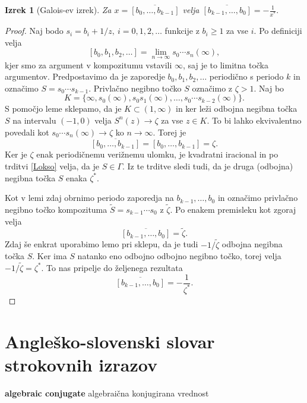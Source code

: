 \documentclass[a4paper,12pt]{article}
\newcommand{\geslo}[2]{\noindent\textbf{#1} \quad \hangindent=1cm #2\\[-1pc]}
\newtheorem*{izrek}{Izrek}
\newenvironment{dokaz}[1][Dokaz]{\begin{proof}}{\end{proof}}
\begin{document}
\begin{izrek}[Galois-ev izrek]
	Za $x = \overline{[b_0, \ldots, b_{k-1}]}$ velja $\overline{[b_{k-1}, \ldots, b_0]} = - \frac{1}{x^*}.$
\end{izrek}


\begin{dokaz}
    Naj bodo $s_i = b_i + 1/z,\ i = 0, 1, 2, \ldots$ funkcije z $b_i \geq 1$ za vse $i$. Po definiciji velja
    \[
        [b_0, b_1, b_2, \ldots] = \lim_{n \to \infty} s_0\cdots s_n (\infty),   
    \]
    kjer smo za argument v kompozitumu vstavili $\infty$, saj je to limitna točka argumentov. Predpostavimo da je zaporedje $b_0, b_1, b_2, \ldots$ periodično s periodo $k$ in označimo $S = s_0\cdots s_{k-1}$. Privlačno negibno točko $S$ označimo z $\zeta > 1$. Naj bo
    \[
        K = \{ \infty, s_0(\infty), s_0s_1(\infty), \ldots, s_0\cdots s_{k-2}(\infty)\}.
    \]
    S pomočjo leme sklepamo, da je $K \subset (1, \infty)$ in ker leži odbojna negibna točka $S$ na intervalu $(-1, 0)$ velja $S^n(z) \to \zeta$ za vse $z \in K$. To bi lahko ekvivalentno povedali kot $s_0\cdots s_n(\infty) \to \zeta$ ko $n \to \infty$. Torej je
    \[
        \overline{[b_0, \ldots, b_{k-1}]} = [b_0, \ldots, b_{k-1}] = \zeta.
    \]
    Ker je $\zeta$ enak periodičnemu verižnemu ulomku, je kvadratni iracional in po trditvi \ref{Lokso} velja, da je $S \in \Gamma$. Iz te trditve sledi tudi, da je druga (odbojna) negibna točka $S$ enaka $\zeta^*$.

    Kot v lemi zdaj obrnimo periodo zaporedja na $b_{k-1}, \ldots, b_0$ in označimo privlačno negibno točko kompozituma $\tilde{S} = s_{k-1}\cdots s_0$ z $\tilde{\zeta}$. Po enakem premisleku kot zgoraj velja
    \[
        \overline{[b_{k-1}, \ldots, b_0]} = \tilde{\zeta}.
    \]
    Zdaj še enkrat uporabimo lemo pri sklepu, da je tudi $- 1 / \tilde{\zeta}$ odbojna negibna točka $S$. Ker ima $S$ natanko eno odbojno odbojno negibno točko, torej velja $- 1 / \tilde{\zeta} = \zeta^*$. To nas pripelje do željenega rezultata
    \[
        \overline{[b_{k-1}, \ldots, b_0]} = - \frac{1}{\zeta^*}.
    \]
\end{dokaz}
\newpage


\section*{Angleško-slovenski slovar strokovnih izrazov}


\geslo{algebraic conjugate}{algebraična konjugirana vrednost}
\end{document}
